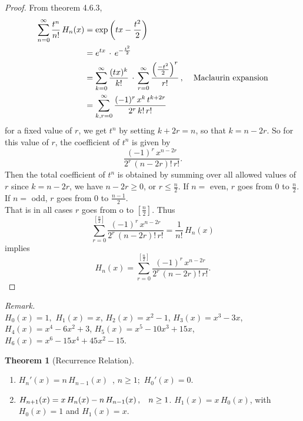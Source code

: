 \documentclass[12pt,a4paper]{report}
\theoremstyle{definition}
\newtheorem{thm}{Theorem}[section]
\theoremstyle{plain}
\begin{document}
\begin{proof}
From theorem 4.6.3,
\begin{align*}
\sum^{\infty}_{n = 0} \frac{t^n}{n!}\, H_n(x) & = \exp\left(tx - \frac{t^2}{2}\right)\\
 & = e^{tx}\, \cdot\, e^{-\frac{t^2}{2}}\\
 & = \sum_{k= 0}^{\infty} \frac{(tx)^k}{k!}\,\cdot\, \sum_{r = 0}^{\infty} \frac{\left(\frac{-t^2}{2}\right)^r}{r!}\, , \hspace{0.4cm} \text{Maclaurin expansion}\\
 &  = \sum_{k,r = 0}^{\infty}\frac{(-1)^r\, x^k\, t^{k + 2r}}{2^r\, k!\, r!}
\end{align*}
for a fixed value of $r$, we get $t^n$ by setting $k + 2r = n$, so that $k = n - 2r$. So for this value of $r$, the coefficient of $t^n$ is given by $$ \frac{(-1)^r\, x^{n-2r}}{2^r\, (n-2r)!\, r!}.$$ 
Then the total coefficient of $t^n$ is obtained by summing over all allowed values of $r$ since $k = n-2r$, we have $n -2r \geq 0$, or $r \leq \frac{n}{2}$. If $n = $ even, $r$ goes from 0 to $\frac{n}{2}$. If $n = $ odd, $r$ goes from 0 to $\frac{n-1}{2}$.\\
That is in all cases $r$ goes from o to $\left[\frac{n}{2}\right].$ Thus
$$\sum_{r=0}^{\left[\frac{n}{2}\right]}\frac{(-1)^r\, x^{n - 2r}}{2^r\, (n - 2r)!\, r!} = \frac{1}{n!}\, H_n(x)$$
implies $$H_n(x) = \sum_{r=0}^{\left[\frac{n}{2}\right]}\frac{(-1)^r\, x^{n - 2r}}{2^r\, (n - 2r)!\, r!}.$$
\end{proof}


\textit{Remark.}\\
$H_0(x) = 1,$ \hspace{0.3cm} $H_1(x) = x $, \hspace{0.3cm} $H_2(x) = x^2 - 1$, \hspace{0.3cm} $H_3(x) = x^3 - 3x$, \hspace{0.3cm} $H_4(x) = x^4 - 6x^2 + 3$, \hspace{0.3cm} $H_5(x) = x^5 - 10x^3 + 15x$, \hspace{0.3cm} $H_6(x) = x^6 - 15x^4 + 45x^2 - 15$.




\begin{thm}[Recurrence Relation]\textbf{}
\vspace*{-6mm}
\begin{enumerate}
\item[(a).] $H_n'(x) = n\, H_{n-1}(x)$\, , \hspace{0.3cm} $n\geq 1;$ \hspace{0.3cm} $H_0'(x) = 0.$
\item[(b).] $H_{n+1}(x) = x\, H_n(x) - n\, H_{n-1}(x)\, , \hspace{0.3cm} n\geq 1$.  $H_1(x) = x\, H_0(x)$, with $H_0(x) = 1$ and $H_1(x) = x$.
\end{enumerate}
\end{thm}
\end{document}
